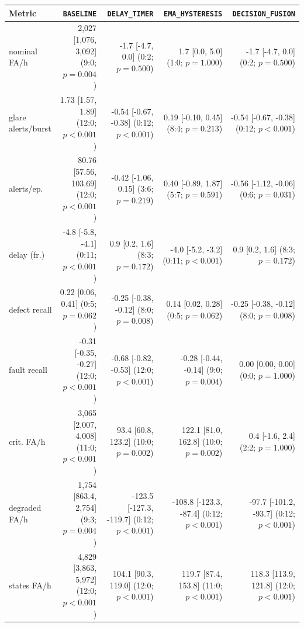 \begin{tabular}{@{}lrrrr@{}}
\toprule
Metric & \texttt{BASELINE} & \texttt{DELAY\_TIMER} & \texttt{EMA\_HYSTERESIS} & \texttt{DECISION\_FUSION} \\
\midrule
nominal FA/h & 2{,}027 [1{,}076, 3{,}092] (9:0; $p=0.004$) & -1.7 [-4.7, 0.0] (0:2; $p=0.500$) & 1.7 [0.0, 5.0] (1:0; $p=1.000$) & -1.7 [-4.7, 0.0] (0:2; $p=0.500$) \\
glare alerts/burst & 1.73 [1.57, 1.89] (12:0; $p<0.001$) & -0.54 [-0.67, -0.38] (0:12; $p<0.001$) & 0.19 [-0.10, 0.45] (8:4; $p=0.213$) & -0.54 [-0.67, -0.38] (0:12; $p<0.001$) \\
alerts/ep. & 80.76 [57.56, 103.69] (12:0; $p<0.001$) & -0.42 [-1.06, 0.15] (3:6; $p=0.219$) & 0.40 [-0.89, 1.87] (5:7; $p=0.591$) & -0.56 [-1.12, -0.06] (0:6; $p=0.031$) \\
delay (fr.) & -4.8 [-5.8, -4.1] (0:11; $p<0.001$) & 0.9 [0.2, 1.6] (8:3; $p=0.172$) & -4.0 [-5.2, -3.2] (0:11; $p<0.001$) & 0.9 [0.2, 1.6] (8:3; $p=0.172$) \\
defect recall & 0.22 [0.06, 0.41] (0:5; $p=0.062$) & -0.25 [-0.38, -0.12] (8:0; $p=0.008$) & 0.14 [0.02, 0.28] (0:5; $p=0.062$) & -0.25 [-0.38, -0.12] (8:0; $p=0.008$) \\
fault recall & -0.31 [-0.35, -0.27] (12:0; $p<0.001$) & -0.68 [-0.82, -0.53] (12:0; $p<0.001$) & -0.28 [-0.44, -0.14] (9:0; $p=0.004$) & 0.00 [0.00, 0.00] (0:0; $p=1.000$) \\
crit. FA/h & 3{,}065 [2{,}007, 4{,}008] (11:0; $p<0.001$) & 93.4 [60.8, 123.2] (10:0; $p=0.002$) & 122.1 [81.0, 162.8] (10:0; $p=0.002$) & 0.4 [-1.6, 2.4] (2:2; $p=1.000$) \\
degraded FA/h & 1{,}754 [863.4, 2{,}754] (9:3; $p=0.004$) & -123.5 [-127.3, -119.7] (0:12; $p<0.001$) & -108.8 [-123.3, -87.4] (0:12; $p<0.001$) & -97.7 [-101.2, -93.7] (0:12; $p<0.001$) \\
states FA/h & 4{,}829 [3{,}863, 5{,}972] (12:0; $p<0.001$) & 104.1 [90.3, 119.0] (12:0; $p<0.001$) & 119.7 [87.4, 153.8] (11:0; $p<0.001$) & 118.3 [113.9, 121.8] (12:0; $p<0.001$) \\
\bottomrule
\end{tabular}
